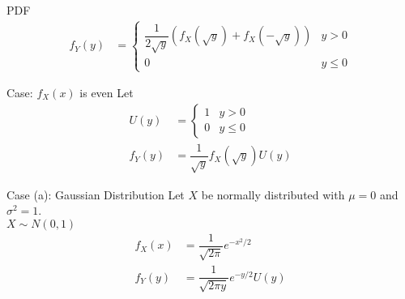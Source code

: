 \documentclass{beamer}
\begin{document}
\begin{frame}
\begin{block}{PDF}
\begingroup
\addtolength{\jot}{.1in}
\begin{align}
f_Y(y)&=\begin{cases}
				 \dfrac{1}{2\sqrt{y}}(f_X(\sqrt{y})+f_X(-\sqrt{y}))&y>0\\
				 0&y\leq0
				 \end{cases}
\end{align}
\endgroup
\end{block}
\begin{exampleblock}{Case: $f_X(x)$ is even}
Let
\begingroup
\addtolength{\jot}{.1in}
\begin{align}
U(y)&=\begin{cases}
			  1&y>0\\
			  0&y\leq0
			  \end{cases}\\
f_Y(y)&=\dfrac{1}{\sqrt{y}}f_X(\sqrt{y})U(y)
\end{align}
\endgroup
\end{exampleblock}
\end{frame}
\begin{frame}
\begin{block}{Case (a): Gaussian Distribution}
Let $X$ be normally distributed with $\mu=0$ and $\sigma^2=1$.\\
$X\sim N(0,1)$
\begingroup
\addtolength{\jot}{.1in}
\begin{align}
f_X(x)&=\dfrac{1}{\sqrt{2\pi}}e^{-x^2/2}\\
f_Y(y)&=\dfrac{1}{\sqrt{2\pi y}}e^{-y/2}U(y)
\end{align}
\endgroup
\end{block}
\end{frame}
\begin{frame}
\begin{figure}[!tbp]
  \centering
  \hfill
\end{figure}
\end{frame}
\end{document}

